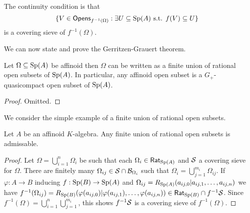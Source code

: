 \begin{remark}
    The continuity condition is that 
    $$\{V\in\mathsf{Opens}_{f^{-1}(\Omega)}:\exists U\subseteq \mathrm{Sp}(A)\text{ s.t. }f(V)\subseteq U\}$$ 
    is a covering sieve of $f^{-1}(\Omega)$. 
\end{remark}
We can now state and prove the Gerritzen-Grauert theorem. 
\begin{theorem}\label{thm: GG thm}
    Let $\Omega\subseteq\mathrm{Sp}(A)$ be affinoid then $\Omega$ can be written as a finite union of rational open subsets of $\mathrm{Sp}(A)$. In particular, any affinoid open subset is a $G_{+}$-quasicompact open subset of $\mathrm{Sp}(A)$.
\end{theorem}
\begin{proof}
    Omitted. 
\end{proof}
We consider the simple example of a finite union of rational open subsets. 
\begin{proposition}\label{prop: finite union of rationals is admissable}
    Let $A$ be an affinoid $K$-algebra. Any finite union of rational open subsets is admissable. 
\end{proposition}
\begin{proof}
    Let $\Omega=\bigcup_{i=1}^{n}\Omega_{i}$ be such that each $\Omega_{i}\in\mathsf{Rat}_{\mathrm{Sp}(A)}$ and $\mathcal{S}$ a covering sieve for $\Omega$. There are finitely many $\Omega_{ij}\in\mathcal{S}\cap\mathcal{B}_{\Omega_{i}}$ such that $\Omega_{i}=\bigcup_{j=1}^{m_{i}}\Omega_{ij}$. If $\varphi:A\to B$ inducing $f:\mathrm{Sp}(B)\to\mathrm{Sp}(A)$ and $\Omega_{ij}=R_{\mathrm{Sp}(A)}(a_{ij,0}|a_{ij,1},\dots,a_{ij,n})$ we have $f^{-1}(\Omega_{ij})=R_{\mathrm{Sp}(B)}(\varphi(a_{ij,0})|\varphi(a_{ij,1}),\dots,\varphi(a_{ij,n}))\in\mathsf{Rat}_{\mathrm{Sp}(B)}\cap f^{-1}\mathcal{S}$. Since $f^{-1}(\Omega)=\bigcup_{i=1}^{n}\bigcup_{j=1}^{m_{i}}$, this shows $f^{-1}\mathcal{S}$ is a covering sieve of $f^{-1}(\Omega)$. 
\end{proof} %
